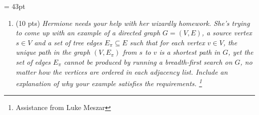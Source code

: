 \documentclass[12pt]{article}
\begin{document}
\renewcommand{\headrulewidth}{0.4pt}
\headheight = 43pt

\renewcommand{\arraystretch}{1.5}

\vspace{-3mm}
\begin{enumerate}

	\item (10 pts) \textit{Hermione needs your help with her wizardly homework. She's trying to come up with an example of a directed graph $G=(V,E)$, a 
source vertex $s\in V$ and a set of tree edges $E_{\pi}\subseteq E$ such that for each vertex $v\in V$, the unique path in the graph $(V,E_{\pi})$ from $s$ to 
$v$ is a shortest path in $G$, yet the set of edges $E_{\pi}$ cannot be produced by running a breadth-first search on $G$, no matter how the vertices are 
ordered in each adjacency list. Include an explanation of why your example satisfies the requirements. \footnote{Assistance from Luke Meszar}}\\
	
	\begin{minipage}{0.4\textwidth}
              \begin{center}
\end{center}
\end{minipage}
\end{enumerate}
\end{document}
